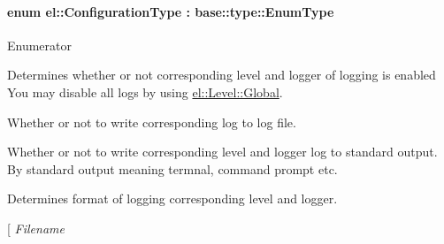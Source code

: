 \paragraph[{Configuration\+Type}]{\setlength{\rightskip}{0pt plus 5cm}enum {\bf el\+::\+Configuration\+Type} \+: base\+::type\+::\+Enum\+Type\hspace{0.3cm}{\ttfamily [strong]}}\label{a00183_a281f5db6d6163678bc68a8b23b59e124}
\begin{Desc}
\item[Enumerator]\par
\begin{description}
\item[{\em 
\hypertarget{a00183_a281f5db6d6163678bc68a8b23b59e124a00d23a76e43b46dae9ec7aa9dcbebb32}{}Enabled\label{a00183_a281f5db6d6163678bc68a8b23b59e124a00d23a76e43b46dae9ec7aa9dcbebb32}
}]Determines whether or not corresponding level and logger of logging is enabled You may disable all logs by using \hyperlink{a00183_ab0ac6091262344c52dd2d3ad099e8e36a4cc6684df7b4a92b1dec6fce3264fac8}{el\+::\+Level\+::\+Global}. \item[{\em 
\hypertarget{a00183_a281f5db6d6163678bc68a8b23b59e124acb76297988b895ca263f62728b32dbcc}{}To\+File\label{a00183_a281f5db6d6163678bc68a8b23b59e124acb76297988b895ca263f62728b32dbcc}
}]Whether or not to write corresponding log to log file. \item[{\em 
\hypertarget{a00183_a281f5db6d6163678bc68a8b23b59e124a9b9a9244b0b26da988f9af8310ab899d}{}To\+Standard\+Output\label{a00183_a281f5db6d6163678bc68a8b23b59e124a9b9a9244b0b26da988f9af8310ab899d}
}]Whether or not to write corresponding level and logger log to standard output. By standard output meaning termnal, command prompt etc. \item[{\em 
\hypertarget{a00183_a281f5db6d6163678bc68a8b23b59e124a520d0db389f362bf79ef56ca0af3dcab}{}Format\label{a00183_a281f5db6d6163678bc68a8b23b59e124a520d0db389f362bf79ef56ca0af3dcab}
}]Determines format of logging corresponding level and logger. \item[{\em 
\hypertarget{a00183_a281f5db6d6163678bc68a8b23b59e124a1351017ac6423911223bc19a8cb7c653}{}Filename\label{a00183_a281f5db6d6163678bc68a8b23b59e124a1351017ac6423911223bc19a8cb7c653}
}
\end{description}
\end{Desc}
